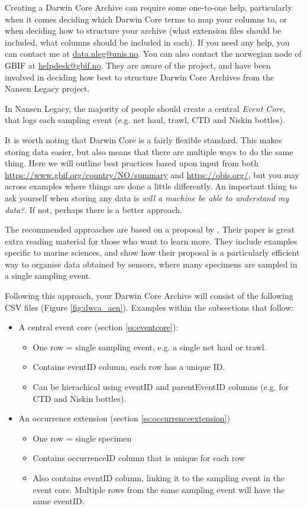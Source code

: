 \documentclass[a4paper,english, 11pt]{article}
\makeatletter
\newcommand{\emailme}{\href{mailto:data.nleg@unis.no}{data.nleg@unis.no}}
\makeatother
\begin{document}
Creating a Darwin Core Archive can require some one-to-one help, particularly when it comes deciding which Darwin Core terms to map your columns to, or when deciding how to structure your archive (what extension files should be included, what columns should be included in each). If you need any help, you can contact me at \emailme. You can also contact the norwegian node of GBIF at \href{mailto:helpdesk@gbif.no}{helpdesk@gbif.no}. They are aware of the project, and have been involved in deciding how best to structure Darwin Core Archives from the Nansen Legacy project.

In Nansen Legacy, the majority of people should create a central \textit{Event Core}, that logs each sampling event (e.g. net haul, trawl, CTD and Niskin bottles).

It is worth noting that Darwin Core is a fairly flexible standard. This makes storing data easier, but also means that there are multiple ways to do the same thing. Here we will outline best practices based upon input from both \href{GBIF Norway}{https://www.gbif.org/country/NO/summary} and \href{OBIS}{https://obis.org/}, but you may across examples where things are done a little differently. An important thing to ask yourself when storing any data is \textit{will a machine be able to understand my data?}. If not, perhaps there is a better approach.

The recommended approaches are based on a proposal by \cite[][option 6]{de2017toward}. Their paper is great extra reading material for those who want to learn more. They include examples specific to marine sciences, and show how their proposal is a particularly efficient way to organise data obtained by sensors, where many specimens are sampled in a single sampling event.

Following this approach, your Darwin Core Archive will consist of the following CSV files (Figure \ref{fig:dwca_aen}). Examples within the subsections that follow:

\begin{itemize}
\item A central event core (section \ref{ss:eventcore}):
\begin{itemize}
\item One row = single sampling event, e.g. a single net haul or trawl.
\item Contains eventID column, each row has a unique ID.
\item Can be hierachical using eventID and parentEventID columns (e.g. for CTD and Niskin bottles).
\end{itemize}
\item An occurrence extension (section \ref{ss:occurrenceextension})
\begin{itemize}
\item One row = single specimen
\item Contains occurrenceID column that is unique for each row
\item Also contains eventID column, linking it to the sampling event in the event core. Multiple rows from the same sampling event will have the same eventID. 
\end{itemize}
\end{itemize}
\end{document}

